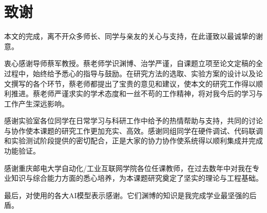 
\chapter{致谢}
{\songti\xiaosi

本文的完成，离不开众多师长、同学与亲友的关心与支持，在此谨致以最诚挚的谢意。

衷心感谢导师蔡军教授。蔡老师学识渊博、治学严谨，自课题立项至论文定稿的全过程中，始终给予悉心的指导与鼓励。在研究方法的选取、实验方案的设计以及论文撰写的各个环节，蔡老师都提出了宝贵的意见和建议，使本文的研究工作得以顺利推进。蔡老师严谨求实的学术态度和一丝不苟的工作精神，将对我今后的学习与工作产生深远影响。

感谢实验室各位同学在日常学习与科研工作中给予的热情帮助与支持，共同的讨论与协作使本课题的研究工作更加充实、高效。感谢同组同学在硬件调试、代码联调和实验测试阶段提供的密切配合，正是大家的协力协作使系统得以顺利集成并完成功能验证。

感谢重庆邮电大学自动化/工业互联网学院各位任课教师，在过去数年中对我在专业知识与综合能力方面的悉心培养，为本课题研究奠定了坚实的理论与工程基础。

最后，对使用的各大AI模型表示感谢。它们渊博的知识是我完成学业最坚强的后盾。

}
